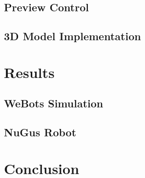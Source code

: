 \documentclass{UoNMCHA}
\begin{document}
		\subsection{Preview Control}
			
		\subsection{3D Model Implementation}
			
	
	\newpage\section{Results}\label{sec:Results}
		
		\subsection{WeBots Simulation}
			
		\subsection{NuGus Robot}
			
	
	\clearpage
	\newpage\section{Conclusion}\label{sec:Conclusion}
		

	\newpage %
		
\end{document}
